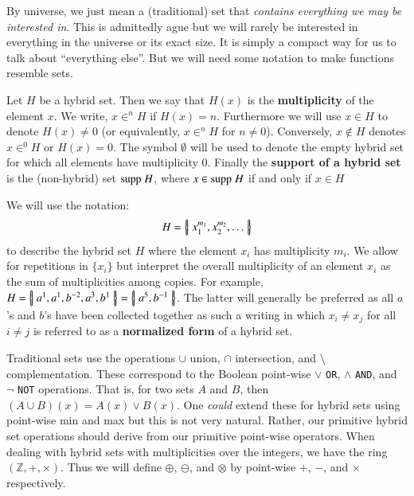 By universe, we just mean a (traditional) set that \emph{contains everything we may be interested in}.
This is admittedly ague but we will rarely be interested in everything in the universe or its exact size.
It is simply a compact way for us to talk about ``everything else''.
But we will need some notation to make functions resemble sets.


\begin{definition}
	Let $H$ be a hybrid set. 
	Then we say that $H(x)$ is the \textbf{multiplicity} of the element $x$. 
	We write, $x \in^n H$ if $H(x)=n$. 
	Furthermore we will use $x \in H$ to denote $H(x)\neq 0$ (or equivalently, $x \in^n H$ for $n\neq 0$).
	Conversely, $x \notin H$ denotes $x \in^0 H$ or $H(x)=0$.
	The symbol $\emptyset$ will be used to denote the empty hybrid set for which all elements have multiplicity 0.
	Finally the \textbf{support of a hybrid set} is the (non-hybrid) set $\text{supp}\;H$,
	where $x \in \text{supp}\;H$ if and only if $x \in H$
\end{definition}


We will use the notation:
\begin{equation*}
	H = \left\{ \! \left| \; x_1^{m_1}, x_2^{m_2},\ldots \; \right| \! \right\}
\end{equation*}
to describe the hybrid set $H$ where the element $x_i$ has multiplicity $m_i$. 
We allow for repetitions in $\{ x_i \}$ but interpret the overall multiplicity of an element $x_i$ as 
the sum of multiplicities among copies. 
For example, $H=\left\{ \! \left| \; a^1, a^1, b^{-2}, a^3, b^1 \; \right| \! \right\} = \left\{ \! \left| \; a^5, b^{-1} \; \right| \! \right\}$. 
The latter will generally be preferred as all $a$'s and $b$'s have been collected together as such
a writing in which $x_i \neq x_j$ for all $i \neq j$ is referred to as a \textbf{normalized form} of a hybrid set. 


Traditional sets use the operations $\cup$ union, $\cap$ intersection, and $\setminus$ complementation.
These correspond to the Boolean point-wise $\vee$ \texttt{OR}, $\wedge$ \texttt{AND}, and $\neg$ \texttt{NOT} 
operations. That is, for two sets $A$ and $B$, then $(A \cup B)(x) = A(x) \vee B(x)$.
One \emph{could} extend these for hybrid sets using point-wise min and max 
\cite{blizard1988, blizard1990, girish2012multiset, singh2011complementation}
but this is not very natural.
Rather, our primitive hybrid set operations should derive from our primitive point-wise operators.
When dealing with hybrid sets with multiplicities over the integers, we have the ring $(\mathbb{Z}, +, \times)$.
Thus we will define $\oplus$, $\ominus$, and $\otimes$ by point-wise $+$, $-$, and $\times$ respectively.



